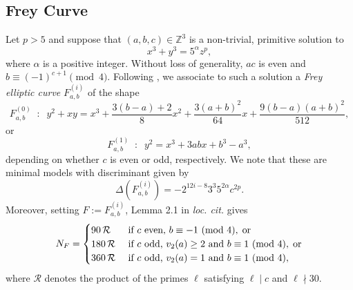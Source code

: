 \documentclass[12pt]{amsart}
\numberwithin{equation}{section}
\theoremstyle{definition}
\newcommand{\Z}{\mathbb{Z}}
\newcommand{\loccit}{{\it loc. cit.}}
\begin{document}
\subsection{Frey Curve}\label{Frey33p}
Let $p > 5$ and suppose that $(a,b,c)\in \Z^3$ is a non-trivial, primitive solution to
\begin{equation}\label{eq:33p5}
x^3+y^3=5^\alpha z^p,
\end{equation}
where $\alpha$ is a positive integer. Without loss of generality, $ac$ is even and $b \equiv (-1)^{c+1} \pmod{4}$.
Following \cite{BBF}, we associate to such a solution a {\it Frey elliptic curve} 
$F^{(i)}_{a,b}$ of the shape
$$
F^{(0)}_{a,b} \; \; : \; \; y^2+xy=x^3 + \frac{3( b-a) +2}{8} x^2 + \frac{3(a+b)^2}{64} x + \frac{ 9 (b-a)(a+b)^2}{512},
$$
or
$$
 F^{(1)}_{a,b} \; \; : \; \;  y^2=x^3+3abx+b^3-a^3,
$$
depending on whether $c$ is even or odd, respectively. We note that these are minimal models with discriminant given by
\[
  \Delta(F^{(i)}_{a,b})=-2^{12i-8} 3^3 5^{2\alpha} c^{2p}.
\]
Moreover, setting $F := F^{(i)}_{a,b}$, Lemma 2.1 in \loccit\: gives
\begin{equation}\label{eq:cond33p}
N_{F}=\begin{cases}
               90 \, \mathcal{R}&\text{ if $c$ even, }b\equiv -1\text{ {\rm (mod} } 4), \; 
               \text{or}\\
               180 \, \mathcal{R}&\text{ if $c$ odd, } v_2(a)\geq 2\text{ and }b\equiv1\text{ {\rm (mod} } 4), \; \text{or}\\
               360 \, \mathcal{R}&\text{ if $c$ odd, } v_2(a)=1\text{ and }b\equiv1\text{ {\rm (mod} } 4),
              \end{cases}\end{equation}
where 
$\mathcal{R}$ denotes the product of the primes $\ell$ satisfying $ \ell \mid c$ and $\ell \nmid 30$.
\end{document}
